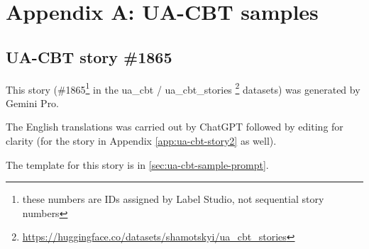 \chapter{Appendix A: UA-CBT samples} %
\label{app:ua-cbt} 


\section{UA-CBT story \#1865}
\label{app:ua-cbt-story}
This story 
(\#1865\footnote{these numbers are IDs assigned by Label Studio, not sequential story numbers} in the ua\_cbt / ua\_cbt\_stories%
\footnote{\href{https://huggingface.co/datasets/shamotskyi/ua_cbt_stories/viewer/default/train?row=6}{https://huggingface.co/datasets/shamotskyi/ua\_cbt\_stories}} datasets)
was generated by Gemini Pro. 

The English translations was carried out by ChatGPT followed by editing for clarity (for the story in Appendix \ref{app:ua-cbt-story2} as well).

The template for this story is in \autoref{sec:ua-cbt-sample-prompt}.

